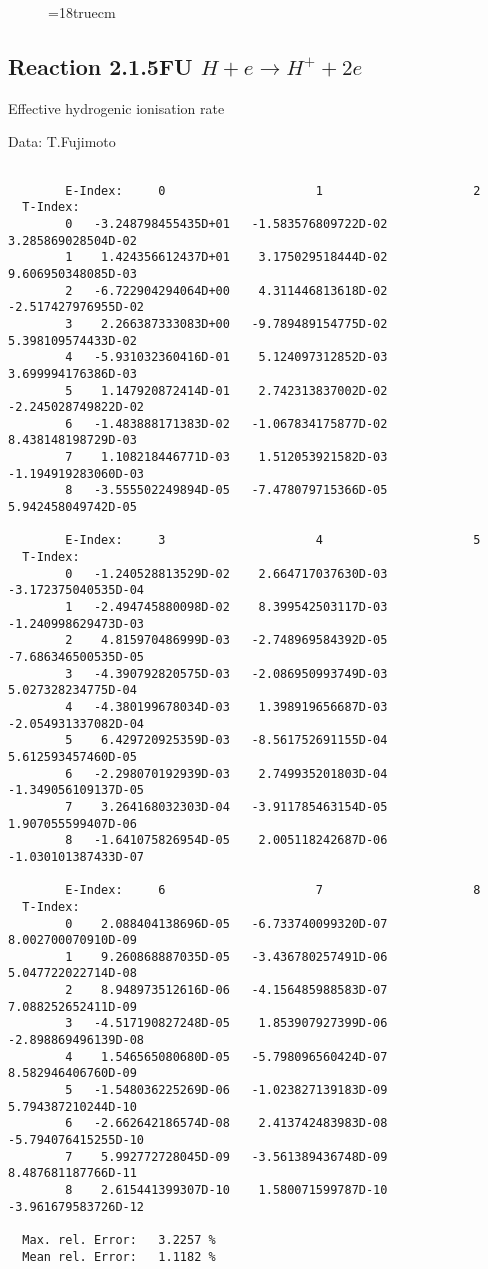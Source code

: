 \begin{figure} \label{2.1.5o}
\epsfxsize=18truecm
\end{figure}
\newpage

\subsection{
Reaction 2.1.5FU $H + e \rightarrow H^+ + 2e $
}


   Effective hydrogenic ionisation rate

   Data: T.Fujimoto

\begin{verbatim}

        E-Index:     0                     1                     2
  T-Index:
        0   -3.248798455435D+01   -1.583576809722D-02    3.285869028504D-02
        1    1.424356612437D+01    3.175029518444D-02    9.606950348085D-03
        2   -6.722904294064D+00    4.311446813618D-02   -2.517427976955D-02
        3    2.266387333083D+00   -9.789489154775D-02    5.398109574433D-02
        4   -5.931032360416D-01    5.124097312852D-03    3.699994176386D-03
        5    1.147920872414D-01    2.742313837002D-02   -2.245028749822D-02
        6   -1.483888171383D-02   -1.067834175877D-02    8.438148198729D-03
        7    1.108218446771D-03    1.512053921582D-03   -1.194919283060D-03
        8   -3.555502249894D-05   -7.478079715366D-05    5.942458049742D-05

        E-Index:     3                     4                     5
  T-Index:
        0   -1.240528813529D-02    2.664717037630D-03   -3.172375040535D-04
        1   -2.494745880098D-02    8.399542503117D-03   -1.240998629473D-03
        2    4.815970486999D-03   -2.748969584392D-05   -7.686346500535D-05
        3   -4.390792820575D-03   -2.086950993749D-03    5.027328234775D-04
        4   -4.380199678034D-03    1.398919656687D-03   -2.054931337082D-04
        5    6.429720925359D-03   -8.561752691155D-04    5.612593457460D-05
        6   -2.298070192939D-03    2.749935201803D-04   -1.349056109137D-05
        7    3.264168032303D-04   -3.911785463154D-05    1.907055599407D-06
        8   -1.641075826954D-05    2.005118242687D-06   -1.030101387433D-07

        E-Index:     6                     7                     8
  T-Index:
        0    2.088404138696D-05   -6.733740099320D-07    8.002700070910D-09
        1    9.260868887035D-05   -3.436780257491D-06    5.047722022714D-08
        2    8.948973512616D-06   -4.156485988583D-07    7.088252652411D-09
        3   -4.517190827248D-05    1.853907927399D-06   -2.898869496139D-08
        4    1.546565080680D-05   -5.798096560424D-07    8.582946406760D-09
        5   -1.548036225269D-06   -1.023827139183D-09    5.794387210244D-10
        6   -2.662642186574D-08    2.413742483983D-08   -5.794076415255D-10
        7    5.992772728045D-09   -3.561389436748D-09    8.487681187766D-11
        8    2.615441399307D-10    1.580071599787D-10   -3.961679583726D-12

  Max. rel. Error:   3.2257 %
  Mean rel. Error:   1.1182 %

\end{verbatim}
